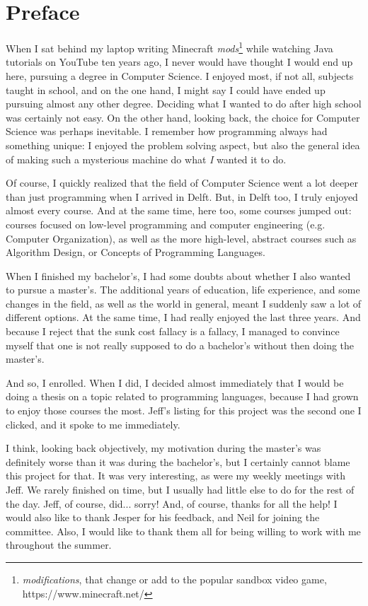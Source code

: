 
\chapter{\label{chap:Preface}Preface}
When I sat behind my laptop writing Minecraft \textit{mods}\footnote{\textit{modifications}, that change or add to the popular sandbox video game, https://www.minecraft.net/} while watching Java tutorials on YouTube ten years ago, I never would have thought I would end up here, pursuing a degree in Computer Science. I enjoyed most, if not all, subjects taught in school, and on the one hand, I might say I could have ended up pursuing almost any other degree. Deciding what I wanted to do after high school was certainly not easy. On the other hand, looking back, the choice for Computer Science was perhaps inevitable. I remember how programming always had something unique: I enjoyed the problem solving aspect, but also the general idea of making such a mysterious machine do what \textit{I} wanted it to do.

Of course, I quickly realized that the field of Computer Science went a lot deeper than just programming when I arrived in Delft. But, in Delft too, I truly enjoyed almost every course. And at the same time, here too, some courses jumped out: courses focused on low-level programming and computer engineering (e.g. Computer Organization), as well as the more high-level, abstract courses such as Algorithm Design, or Concepts of Programming Languages.

When I finished my bachelor's, I had some doubts about whether I also wanted to pursue a master's. The additional years of education, life experience, and some changes in the field, as well as the world in general, meant I suddenly saw a lot of different options. At the same time, I had really enjoyed the last three years. And because I reject that the sunk cost fallacy is a fallacy, I managed to convince myself that one is not really supposed to do a bachelor's without then doing the master's.

And so, I enrolled. When I did, I decided almost immediately that I would be doing a thesis on a topic related to programming languages, because I had grown to enjoy those courses the most. Jeff's listing for this project was the second one I clicked, and it spoke to me immediately.

I think, looking back objectively, my motivation during the master's was definitely worse than it was during the bachelor's, but I certainly cannot blame this project for that. It was very interesting, as were my weekly meetings with Jeff. We rarely finished on time, but I usually had little else to do for the rest of the day. Jeff, of course, did... sorry! And, of course, thanks for all the help! I would also like to thank Jesper for his feedback, and Neil for joining the committee. Also, I would like to thank them all for being willing to work with me throughout the summer.

